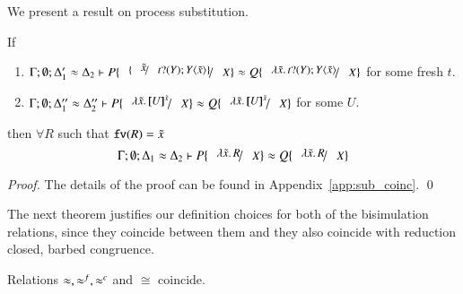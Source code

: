 \begin{comment}
		\item	$\forall \ell \notin \set{\news{\tilde{m}'} \bactout{n}{m}, \news{\tilde{m}} \bactout{n}{\abs{x}{P}}}$ such that
			\[
				\horel{\Gamma}{\Delta_1}{P_1}{\hby{\ell}}{\Delta_1'}{P_2}
			\]
			implies that $\exists Q_2$ such that 
			\[
				\horel{\Gamma}{\Delta_1}{Q_1}{\Hby{\ell}}{\Delta_1'}{Q_2}
			\]
			and
			$\horel{\Gamma}{\Delta_1'}{P_2}{\ \mathcal{R}\ }{\Delta_2'}{Q_2}$

		\item	The symmetric cases of 1, 2 and 3.
	\end{enumerate}
	The Knaster Tarski theorem ensures that the largest bisimulation exists,
	it is called bisimilarity and is denoted by $\wb$.
\end{definition}
\end{comment}

We present a result on process substitution.

\begin{lemma}\rm
	\label{lem:proc_subst}
	If 
%
	\begin{enumerate}
		\item	$\horel{\Gamma}{\Delta_1'}{P \subst{\subst{\tilde{x}}{\binp{t}{Y} \appl{Y}{\tilde{x}}}}{X}}{\wb}{\Delta_2}{Q \subst{\abs{\tilde{x}}{\binp{t}{Y} \appl{Y}{\tilde{x}}}}{X}}$
			for some fresh $t$.

		\item	$\horel{\Gamma}{\Delta_1''}{P \subst{\abs{\tilde{x}}{\map{U}^{\tilde{x}}}}{X}}{\wb}{\Delta_2''}{Q \subst{\abs{\tilde{x}}{\map{U}^{\tilde{x}}}}{X}}$
			for some $U$.
	\end{enumerate}
%
	then $\forall R$ such that $\mathtt{fv}(R) = \tilde{x}$
\[
	\horel{\Gamma}{\Delta_1}{P \subst{\abs{\tilde{x}}{R}}{X}}{\wb}{\Delta_2}{Q \subst{\abs{\tilde{x}}{R}}{X}}
\]
\end{lemma}

\begin{proof}
	The details of the proof can be found in Appendix~\ref{app:sub_coinc}.
	\qed
\end{proof}

The next theorem justifies our definition choices
for both of the bisimulation relations, since
they coincide between them and they also
coincide with reduction closed, barbed congruence.

\begin{theorem}[Coincidence]\rm
	\label{the:coincidence}
	Relations $\approx, \approx^f, \approx^{c}$ and $\cong$ coincide.
\end{theorem}

